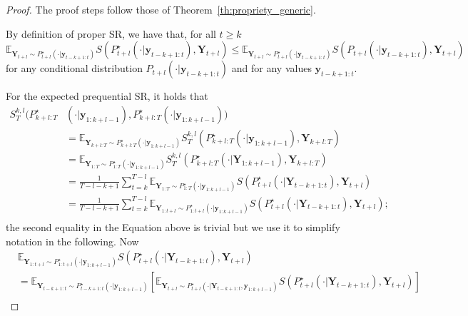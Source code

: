\documentclass[twoside,11pt]{article}
\newcommand{\E}{\mathbb{E}}
\newcommand{\ddobs}{\mathbf{y}}
\newcommand{\Ddobs}{\mathbf{Y}}
\newcommand{\Ddobsuptminus}{\mathbf{Y}_{t-k+1:t}}
\newcommand{\ddobsuptminus}{\mathbf{y}_{t-k+1:t}}
\begin{document}
	\begin{proof}
		The proof steps follow those of Theorem~\ref{th:propriety_generic}.
		
		By definition of proper SR, we have that, for all $ t\ge k $
		\begin{equation}\label{Eq:proper_SR_app}
		\E_{\Ddobs_{t+l}\sim P_{t+l}^\star(\cdot|\ddobsuptminus)} S(P^\star_{t+l}(\cdot|\ddobsuptminus) ,\Ddobs_{t+l}) \le \E_{\Ddobs_{t+l}\sim P_{t+l}^\star(\cdot|\ddobsuptminus)} S(P_{t+l}(\cdot|\ddobsuptminus), \Ddobs_{t+l})
		\end{equation}
		for any conditional distribution $ P_{t+l}(\cdot|\ddobsuptminus) $ and for any values $ \ddobsuptminus $.
		
		For the expected prequential SR, it holds that
		\begin{equation}\label{key}
		\begin{aligned}
		S_T^{k,l}(P^\star_{k+l:T}&(\cdot|\ddobs_{1:k+l-1}), P_{k+l:T}^\star(\cdot|\ddobs_{1:k+l-1})) \\
		&= \E_{\Ddobs_{k+l:T}\sim P_{k+l:T}^\star(\cdot|\ddobs_{1:k+l-1})} S_T^{k,l}(P^\star_{k+l:T}(\cdot|\ddobs_{1:k+l-1}), \Ddobs_{k+l:T}) \\&= \E_{\Ddobs_{1:T}\sim P_{1:T}^\star(\cdot|\ddobs_{1:k+l-1})} S_T^{k,l}(P^\star_{k+l:T}(\cdot|\Ddobs_{1:k+l-1}), \Ddobs_{k+l:T}) \\
		&= \frac{1}{T-l-k+1} \sum_{t=k}^{T-l} \E_{\Ddobs_{1:T}\sim P^\star_{1:T}(\cdot|\ddobs_{1:k+l-1})} S(P^\star_{t+l}(\cdot|\Ddobs_{t-k+1:t}),\Ddobs_{t+l}) \\
		&= \frac{1}{T-l-k+1} \sum_{t=k}^{T-l} \E_{\Ddobs_{1:t+l}\sim P^\star_{1:t+l}(\cdot|\ddobs_{1:k+l-1})} S(P^\star_{t+l}(\cdot|\Ddobs_{t-k+1:t}),\Ddobs_{t+l}); \\
		\end{aligned}
		\end{equation}
		the second equality in the Equation above is trivial but we use it to simplify notation in the following. Now
		\begin{equation}\label{Eq:preq_SR_proof2_2}
		\begin{aligned}
		&\E_{\Ddobs_{1:t+l}\sim P^\star_{1:t+l}(\cdot|\ddobs_{1:k+l-1})} S(P^\star_{t+l}(\cdot|\Ddobs_{t-k+1:t}),\Ddobs_{t+l})\\
		&= \E_{\Ddobs_{t-k+1:t} \sim P^\star_{t-k+1:t}(\cdot|\ddobs_{1:k+l-1})}\left[\E_{\Ddobs_{t+l}\sim P^\star_{t+l}(\cdot|\Ddobs_{t-k+1:t},\ddobs_{1:k+l-1})}  S(P^\star_{t+l}(\cdot|\Ddobsuptminus), \Ddobs_{t+l}) \right] \\

\end{aligned}
\end{equation}
\end{proof}
\end{document}
